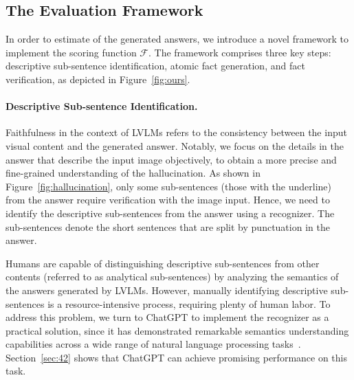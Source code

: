 \subsection{The Evaluation Framework}
\label{32}
In order to estimate \ours of the generated answers, we introduce a novel framework to implement the scoring function $\mathcal{F}$. The framework comprises three key steps: descriptive sub-sentence identification, atomic fact generation, and fact verification, as depicted in Figure~\ref{fig:ours}. 

\paragraph{Descriptive Sub-sentence Identification.} 
Faithfulness in the context of LVLMs refers to the consistency between the input visual content and the generated answer. Notably, we focus on the details in the answer that describe the input image objectively, to obtain a more precise and fine-grained understanding of the hallucination. 
As shown in Figure~\ref{fig:hallucination}, only some sub-sentences (\ie those with the underline) from the answer require verification with the image input.
 Hence, we need to identify the descriptive sub-sentences from the answer using a recognizer. The sub-sentences denote the short sentences that are split by punctuation in the answer. 

Humans are capable of distinguishing descriptive sub-sentences from other contents (referred to as analytical sub-sentences) by analyzing the semantics of the answers generated by LVLMs. However, manually identifying descriptive sub-sentences is a resource-intensive process, requiring plenty of human labor. To address this problem, we turn to ChatGPT to implement the recognizer as a practical solution, since it has demonstrated 
remarkable semantics understanding capabilities across a wide range of natural language processing tasks~\cite{chatgpt}. Section~\ref{sec:42} shows that ChatGPT can achieve promising performance on this task.

